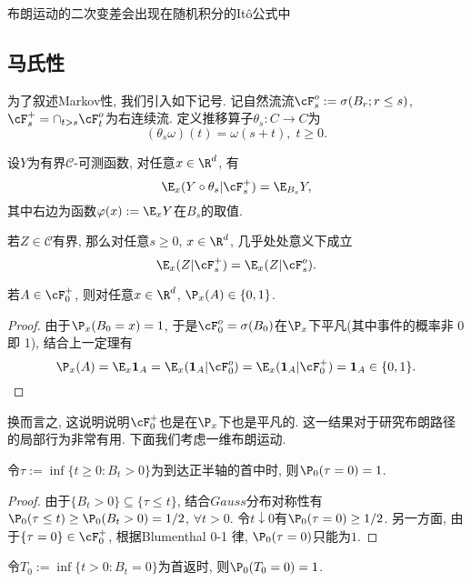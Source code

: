 \documentclass[a4paper, 10pt]{ctexart}
\begin{document}
布朗运动的二次变差会出现在随机积分的Itô公式中




\subsection{马氏性}

\noindent
为了叙述Markov性, 我们引入如下记号. 
记自然流流$\cF_s^o := \sigma(B_r; r \leq s)$, $\cF_s^+ = \cap_{t > s} \cF_t^o$为右连续流. 
定义推移算子$\theta_s \colon C \to C$为
\begin{equation*}
	(\theta_s \omega) (t) = \omega(s + t),\; t \geq 0. 
\end{equation*}

\begin{theorem}[Markov性]
	设$Y$为有界$\mathcal C$-可测函数, 对任意$x \in \R^d$, 有
	\begin{equation*}
		\E_x(Y \circ \theta_s | \cF_s^+) = \E_{B_s} Y, 
	\end{equation*}
	其中右边为函数$\varphi(x):=\E_x Y$在$B_s$的取值. 
\end{theorem}

\begin{theorem}
	若$Z \in \mathcal C$有界, 那么对任意$s \geq 0$, $x \in \R^d$, 几乎处处意义下成立
	\begin{equation*}
		\E_x(Z | \cF_s^+) = \E_x(Z | \cF_s^o). 
	\end{equation*}
\end{theorem}

\begin{theorem}[Blumenthal 0-1 律]
	若$A \in \cF_0^+$, 则对任意$x \in \R^d$, $\P_x(A) \in \{0, 1\}$. 
\end{theorem}
\begin{proof}
	由于$\P_x(B_0 = x) =1$, 于是$\cF_0^o = \sigma(B_0)$在$\P_x$下平凡(其中事件的概率非 0 即 1), 结合上一定理有
	\begin{equation*}
		\P_x(A) = \E_x \mathbf 1_A = \E_x(\mathbf 1_A| \cF_0^o) = \E_x(\mathbf 1_A| \cF_0^+) = \mathbf 1_A \in \{0, 1\}. 
	\end{equation*}
\end{proof}

换而言之, 这说明说明$\cF_0^+$也是在$\P_x$下也是平凡的. 
这一结果对于研究布朗路径的局部行为非常有用. 
下面我们考虑一维布朗运动. 
\begin{theorem}
	令$\tau := \inf\{ t \geq 0 \colon B_t > 0\}$为到达正半轴的首中时, 则$\P_0(\tau = 0) = 1$. 
\end{theorem}
\begin{proof}
	由于$\{ B_t > 0 \} \subseteq \{ \tau \leq t \}$, 结合$Gauss$分布对称性有$\P_0(\tau \leq t) \geq \P_0(B_t > 0) = 1/2$, $\forall t > 0$.  
	令$t \downarrow 0$有$\P_0(\tau = 0) \geq 1/2$. 
	另一方面, 由于$\{\tau = 0\} \in \cF_0^+$, 根据Blumenthal 0-1 律, $\P_0(\tau = 0)$只能为$1$.
\end{proof}
\begin{theorem}
	令$T_0 := \inf\{t>0 \colon B_t = 0\}$为首返时, 则$\P_0(T_0 = 0) = 1$. 
\end{theorem}
\end{document}
